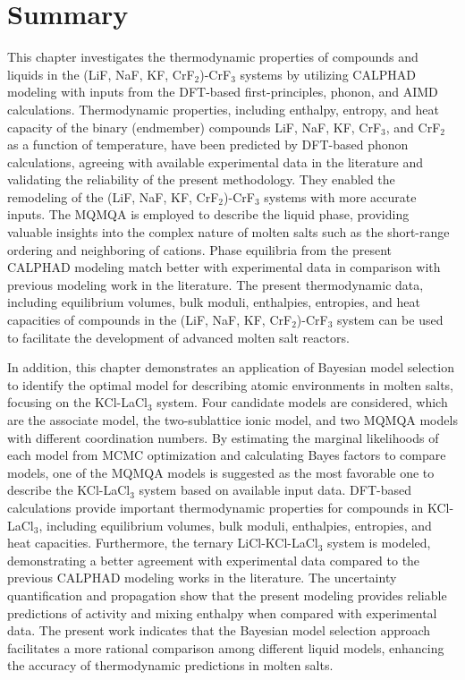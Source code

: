 \section{Summary} \label{moltensalts:sec:Summary}
This chapter investigates the thermodynamic properties of compounds and liquids in the (LiF, NaF, KF, CrF$_2$)-CrF$_3$ systems by utilizing CALPHAD modeling with inputs from the DFT-based first-principles, phonon, and AIMD calculations. Thermodynamic properties, including enthalpy, entropy, and heat capacity of the binary (endmember) compounds LiF, NaF, KF, CrF$_3$, and CrF$_2$ as a function of temperature, have been predicted by DFT-based phonon calculations, agreeing with available experimental data in the literature and validating the reliability of the present methodology. They enabled the remodeling of the (LiF, NaF, KF, CrF$_2$)-CrF$_3$ systems with more accurate inputs. The MQMQA is employed to describe the liquid phase, providing valuable insights into the complex nature of molten salts such as the short-range ordering and neighboring of cations. Phase equilibria from the present CALPHAD modeling match better with experimental data in comparison with previous modeling work in the literature. The present thermodynamic data, including equilibrium volumes, bulk moduli, enthalpies, entropies, and heat capacities of compounds in the (LiF, NaF, KF, CrF$_2$)-CrF$_3$ system can be used to facilitate the development of advanced molten salt reactors.

In addition, this chapter demonstrates an application of Bayesian model selection to identify the optimal model for describing atomic environments in molten salts, focusing on the KCl-LaCl$_3$ system. Four candidate models are considered, which are the associate model, the two-sublattice ionic model, and two MQMQA models with different coordination numbers. By estimating the marginal likelihoods of each model from MCMC optimization and calculating Bayes factors to compare models, one of the MQMQA models is suggested as the most favorable one to describe the KCl-LaCl$_3$ system based on available input data. DFT-based calculations provide important thermodynamic properties for compounds in KCl-LaCl$_3$, including equilibrium volumes, bulk moduli, enthalpies, entropies, and heat capacities. Furthermore, the ternary LiCl-KCl-LaCl$_3$ system is modeled, demonstrating a better agreement with experimental data compared to the previous CALPHAD modeling works in the literature. The uncertainty quantification and propagation show that the present modeling provides reliable predictions of activity and mixing enthalpy when compared with experimental data. The present work indicates that the Bayesian model selection approach facilitates a more rational comparison among different liquid models, enhancing the accuracy of thermodynamic predictions in molten salts.